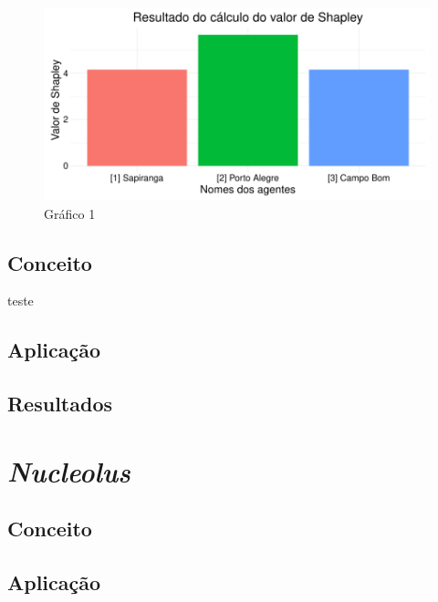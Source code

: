 \documentclass[
	article,			        %
	11pt,				          %
	oneside,			        %
	a4paper,			        %
	english,			        %
	brazil,				        %
	sumario=tradicional
]{abntex2}\usepackage[]{graphicx}\usepackage[]{color}
\makeatletter
\def\maxwidth{ %
  \ifdim\Gin@nat@width>\linewidth
    \linewidth
  \else
    \Gin@nat@width
  \fi
}
\newenvironment{knitrout}{}{} %
\makeatother
\begin{document}
\begin{knitrout}
\color{fgcolor}\begin{figure}[h]

{\centering \includegraphics[width=\maxwidth]{figure/unnamed-chunk-3-1} 

}

\caption[Gráfico 1]{Gráfico 1}\label{fig:unnamed-chunk-3}
\end{figure}


\end{knitrout}

\subsection{Conceito}

teste

\subsection{Aplicação}

\subsection{Resultados}

\section{\emph{Nucleolus}}

\subsection{Conceito}

\subsection{Aplicação}
\end{document}
